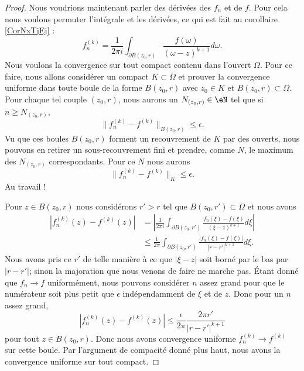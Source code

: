 \begin{proof}
    Nous voudrions maintenant parler des dérivées des \( f_n\) et de \( f\). Pour cela nous voulons permuter l'intégrale et les dérivées, ce qui est fait au corollaire \ref{CorNxTjEj} :
    \begin{equation}
        f_n^{(k)}=\frac{1}{ 2\pi i }\int_{\partial B(z_0,r)}\frac{ f(\omega) }{ (\omega-z)^{k+1} }d\omega.
    \end{equation}
    Nous voulons la convergence sur tout compact contenu dans l'ouvert \( \Omega\). Pour ce faire, nous allons considérer un compact \( K\subset \Omega\) et prouver la convergence uniforme dans toute boule de la forme \( B(z_0,r)\) avec \( z_0\in K\) et \( B(z_0,r)\subset \Omega\). Pour chaque tel couple \( (z_0,r)\), nous aurons un \( N_{(z_0,r)}\in \eN\) tel que si \( n\geq N_{(z_0,r)}\),
    \begin{equation}
        \| f_n^{(k)}-f^{(k)} \|_{B(z_0,r)}\leq \epsilon.
    \end{equation}
    Vu que ces boules \( B(z_0,r)\) forment un recouvrement de \( K\) par des ouverts, nous pouvons en retirer un sous-recouvrement fini et prendre, comme \( N\), le maximum des \( N_{(z_0,r)}\) correspondants. Pour ce \( N\) nous aurons
    \begin{equation}
        \| f_n^{(k)}-f^{(k)} \|_K\leq \epsilon.
    \end{equation}
    Au travail !

    Pour \( z\in B(z_0,r)\) nous considérons \( r'>r\) tel que \( B(z_0,r')\subset \Omega\) et nous avons
    \begin{subequations}
        \begin{align}
            | f^{(k)}_n(z)-f^{(k)}(z) |&=\left| \frac{1}{ 2\pi i }\int_{\partial B(z_0,r')}\frac{ f_n(\xi)-f(\xi) }{ (\xi-z)^{k+1} }d\xi \right| \\
            &\leq\frac{1}{ 2\pi }\int_{\partial B(z_0,r')}\frac{ | f_n(\xi)-f(\xi) | }{ | r-r' |^{k+1} }d\xi.
        \end{align}
    \end{subequations}
    Nous avons pris ce \( r'\) de telle manière à ce que \( | \xi-z |\) soit borné par le bas par \( | r-r' |\); sinon la majoration que nous venons de faire ne marche pas. Étant donné que \( f_n\to f\) uniformément, nous pouvons considérer \( n\) assez grand pour que le numérateur soit plus petit que \( \epsilon\) indépendamment de \( \xi\) et de \( z\). Donc pour un \( n\) assez grand,
    \begin{equation}
        | f^{(k)}_n(z)-f^{(k)}(z) |\leq \frac{ \epsilon }{ 2\pi }\frac{ 2\pi r' }{ | r-r' |^{k+1} }
    \end{equation}
    pour tout \( z\in B(z_0,r)\). Donc nous avons convergence uniforme \( f_n^{(k)}\to f^{(k)}\) sur cette boule. Par l'argument de compacité donné plus haut, nous avons la convergence uniforme sur tout compact.
\end{proof}

